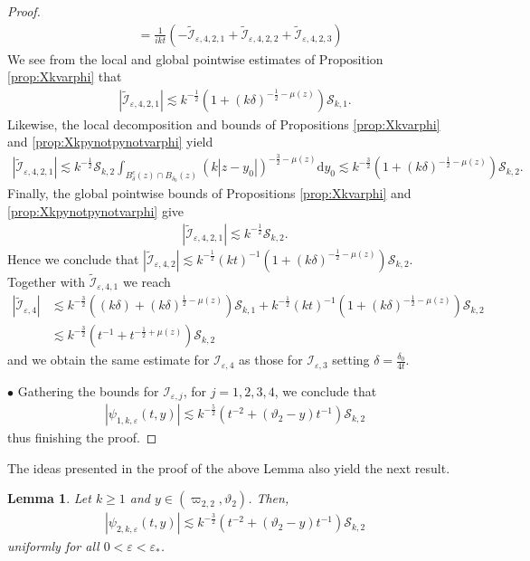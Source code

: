 \documentclass[11pt,reqno]{amsproc}
\newcommand{\bullpar}[1]{\vspace{.5em}\noindent $\bullet$ \normalfont {\bfseries #1.}}
\newtheorem{lemma}[proposition]{Lemma}
\theoremstyle{definition}
\numberwithin{equation}{section}
\newcommand{\cI}{{\mathcal I}}
\newcommand{\cS}{{\mathcal S}}
\renewcommand{\d}{\mathrm{d}}
\newcommand{\ep}{\varepsilon}
\begin{document}
\begin{proof}
\begin{align*}
&= \frac{1}{ikt}\left( -\widetilde\cI_{\ep,4,2,1} + \widetilde\cI_{\ep,4,2,2} + \widetilde\cI_{\ep,4,2,3} \right)
\end{align*}
We see from the local and global pointwise estimates of Proposition \ref{prop:Xkvarphi} that
\begin{align*}
\left|\widetilde\cI_{\ep,4,2,1} \right| \lesssim k^{-\frac12} \left( 1 + (k\delta)^{-\frac12-\mu(z)} \right) \cS_{k,1}.
\end{align*}
Likewise, the local decomposition and bounds of Propositions \ref{prop:Xkvarphi} and \ref{prop:Xkpynotpynotvarphi} yield
\begin{align*}
\left|\widetilde\cI_{\ep,4,2,1} \right| \lesssim k^{-\frac12}\cS_{k,2}\int_{B_\delta^c(z)\cap B_{\delta_0}(z)} (k|z-y_0|)^{-\frac32-\mu(z)} \d y_0 \lesssim k^{-\frac32}\left( 1 + (k\delta)^{-\frac12-\mu(z)}\right)\cS_{k,2}.
\end{align*}
Finally, the global pointwise bounds of Propositions \ref{prop:Xkvarphi} and \ref{prop:Xkpynotpynotvarphi} give
\begin{align*}
\left|\widetilde\cI_{\ep,4,2,1} \right| \lesssim k^{-\frac12}\cS_{k,2}.
\end{align*}
Hence we conclude that $\left| \widetilde\cI_{\ep,4,2} \right| \lesssim k^{-\frac12}(kt)^{-1}\left( 1 + (k\delta)^{-\frac12-\mu(z)} \right) \cS_{k,2}$. Together with $\widetilde\cI_{\ep,4,1}$ we reach
\begin{align*}
\left| \widetilde\cI_{\ep,4} \right| &\lesssim k^{-\frac32} \left( (k\delta) + (k\delta)^{\frac12-\mu(z)}\right) \cS_{k,1} + k^{-\frac12}(kt)^{-1}\left( 1 + (k\delta)^{-\frac12-\mu(z)} \right) \cS_{k,2} \\
&\lesssim k^{-\frac32} \left( t^{-1} + t^{-\frac12+\mu(z)} \right) \cS_{k,2}
\end{align*}
and we obtain the same estimate for $\cI_{\ep,4}$ as those for $\cI_{\ep,3}$ setting $\delta = \frac{\delta_0}{4t}$.

\bullpar{End of proof} Gathering the bounds for $\cI_{\ep,j}$, for $j=1,2,3,4$, we conclude that 
\begin{align*}
\left| \psi_{1,k,\ep}(t,y) \right| \lesssim k^{-\frac52}\left( t^{-2} + (\vartheta_2-y)t^{-1} \right)\cS_{k,2} 
\end{align*}
thus finishing the proof.
\end{proof}

The ideas presented in the proof of the above Lemma also yield the next result.

\begin{lemma}\label{lemma:secondintegralIDpsiweak}
Let $k\geq 1$ and $y\in (\varpi_{2,2}, \vartheta_2)$. Then,
\begin{align*}
\left| \psi_{2,k,\ep}(t,y) \right| \lesssim k^{-\frac32}\left( t^{-2} + (\vartheta_2-y)t^{-1} \right)\cS_{k,2} 
\end{align*}
uniformly for all $0<\ep<\ep_*$.
\end{lemma}
\end{document}
